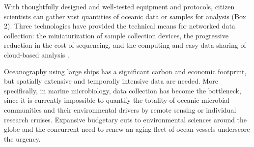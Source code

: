 With thoughtfully designed and well-tested equipment and protocols, citizen scientists can gather vast quantities of oceanic data or samples for analysis (Box 2). Three technologies have provided the technical means for networked data collection: the miniaturization of sample collection devices, the progressive reduction in the cost of sequencing, and the computing and easy data sharing of cloud-based analysis \cite{haklay2013citizen}.

Oceanography using large ships has a significant carbon and economic footprint, but spatially extensive and temporally intensive data are needed. More specifically, in marine microbiology, data collection has become the bottleneck, since it is currently impossible to quantify the totality of oceanic microbial communities and their environmental drivers by remote sensing or individual research cruises. Expansive budgetary cuts to environmental sciences around the globe and the concurrent need to renew an aging fleet of ocean vessels \cite{cressey2014us} underscore the urgency.
